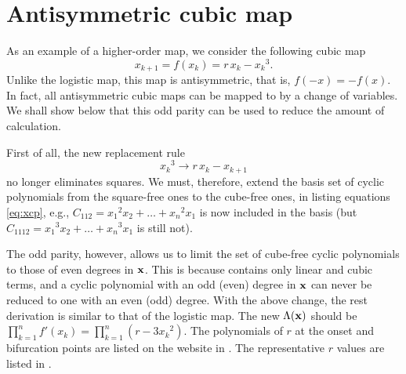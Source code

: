 \documentclass{ws-ijbc}
\begin{document}
\section{\label{sec:cubic}Antisymmetric cubic map}


As an example of a higher-order %
map, we consider the following cubic map \cite{strogatz}
%
\begin{equation}
  x_{k + 1} = f(x_k) = r \, x_k - {x_k}^3.
\label{eq:cubic}
\end{equation}
%
Unlike the logistic map, this map is antisymmetric,
  that is, $f(-x) = -f(x)$.
%
In fact, all antisymmetric cubic maps \cite{brown3, brown4}
  can be mapped to  by a change of variables.
We shall show below that this odd parity can be used to reduce the amount of calculation.

First of all, the new replacement rule
\begin{equation}
  {x_k}^3 \rightarrow r \, x_k - x_{k+1}
\label{eq:cubreplace}
\end{equation}
no longer eliminates squares.
%
We must, therefore, extend the basis set of cyclic polynomials
  from the square-free ones to the cube-free ones,
  in listing equations \eqref{eq:xcp},
  e.g.,
  $C_{112} = {x_1}^2 x_2 + \dots + {x_n}^2 x_1$
  is now included in the basis
  (but
  $C_{1112} = {x_1}^3 x_2 + \dots + {x_n}^3 x_1$
  is still not).


The odd parity, however, allows us to limit
  the set of cube-free cyclic polynomials
  to those of even degrees in $\mathbf{x}$.
%
This is because  contains only linear and cubic terms,
and a cyclic polynomial with an odd (even) degree in $\mathbf{x}$
can never be reduced to one with an even (odd) degree.
%
%
%
%
%
%
With the above change, the rest derivation is similar to that of the logistic map.
The new $\Lambda(\mathbf{x})$ should be
$\prod_{k=1}^n f'(x_k) = \prod_{k=1}^n (r - 3 {x_k}^2)$.
%
The polynomials of $r$
  at the onset and bifurcation points
  are listed on the website in .
%
The representative $r$ values are listed in .
%
\end{document}
